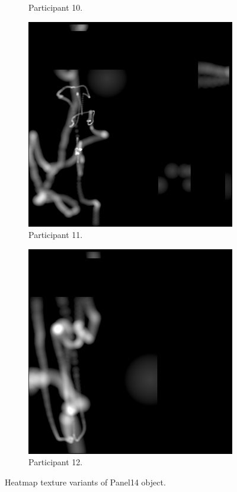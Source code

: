 \begin{figure}[!ht]
\begin{subfigure}[b]{0.24\textwidth}
        \caption{Participant 10.}
    \end{subfigure}
    \hfill    
    \begin{subfigure}[b]{0.24\textwidth}
        \centering
        \includegraphics[width=\textwidth]{img/data/Panel14/single/11.png}
        \caption{Participant 11.}
    \end{subfigure}
    \hfill    
    \begin{subfigure}[b]{0.24\textwidth}
        \centering
        \includegraphics[width=\textwidth]{img/data/Panel14/single/12.png}
        \caption{Participant 12.}
    \end{subfigure}
    \caption{Heatmap texture variants of Panel14 object.}
    \label{fig:Panel14-object-heatmaps}
\end{figure}


